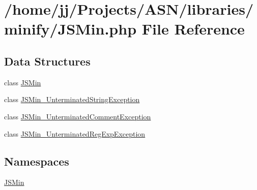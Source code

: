 \hypertarget{_j_s_min_8php}{}\section{/home/jj/\+Projects/\+A\+S\+N/libraries/minify/\+J\+S\+Min.php File Reference}
\label{_j_s_min_8php}
\subsection*{Data Structures}
\begin{DoxyCompactItemize}
\item 
class \hyperlink{class_j_s_min}{J\+S\+Min}
\item 
class \hyperlink{class_j_s_min___unterminated_string_exception}{J\+S\+Min\+\_\+\+Unterminated\+String\+Exception}
\item 
class \hyperlink{class_j_s_min___unterminated_comment_exception}{J\+S\+Min\+\_\+\+Unterminated\+Comment\+Exception}
\item 
class \hyperlink{class_j_s_min___unterminated_reg_exp_exception}{J\+S\+Min\+\_\+\+Unterminated\+Reg\+Exp\+Exception}
\end{DoxyCompactItemize}
\subsection*{Namespaces}
\begin{DoxyCompactItemize}
\item 
 \hyperlink{namespace_j_s_min}{J\+S\+Min}
\end{DoxyCompactItemize}
